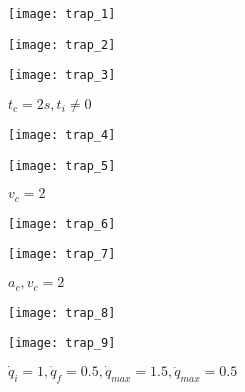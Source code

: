 \begin{figure}
\begin{minipage}{0.333\textwidth}
\centering
\texttt{[image: trap\_1]}
\caption{$t_c=2s$}
\label{fig:trap_1}
\end{minipage}
\begin{minipage}{0.333\textwidth}
\centering
\texttt{[image: trap\_2]}
\caption{$t_c=2s, q_f>q_i$}
\label{fig:trap_2}
\end{minipage}
\begin{minipage}{0.333\textwidth}
\centering
\texttt{[image: trap\_3]}
\caption{$t_c=2s, t_i\neq 0$}
\label{fig:trap_3}
\end{minipage}
\end{figure}

\begin{figure}
\begin{minipage}{0.5\textwidth}
\centering
\texttt{[image: trap\_4]}
\caption{$v_c=v_{c,lim}=2$}
\label{fig:trap_4}
\end{minipage}
\begin{minipage}{0.5\textwidth}
\centering
\texttt{[image: trap\_5]}
\caption{$v_c=2$}
\label{fig:trap_5}
\end{minipage}
\end{figure}

\begin{figure}
\begin{minipage}{0.5\textwidth}
\centering
\texttt{[image: trap\_6]}
\caption{$a_c=2$}
\label{fig:trap_6}
\end{minipage}
\begin{minipage}{0.5\textwidth}
\centering
\texttt{[image: trap\_7]}
\caption{$a_c,v_c=2$}
\label{fig:trap_7}
\end{minipage}
\end{figure}

\begin{figure}
\begin{minipage}{0.5\textwidth}
\centering
\texttt{[image: trap\_8]}
\caption{$\dot q_i=1,\dot q_f=0.5,\ddot q_{max}=0.5$}
\label{fig:trap_8}
\end{minipage}
\begin{minipage}{0.5\textwidth}
\centering
\texttt{[image: trap\_9]}
\caption{$\dot q_i=1,\dot q_f=0.5,\dot q_{max}=1.5,\ddot q_{max}=0.5$}
\label{fig:trap_9}
\end{minipage}
\end{figure}

